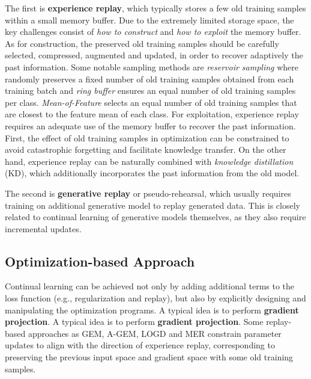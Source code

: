 The first is \textbf{experience replay}, which typically stores a few old training samples within a small memory buffer. Due to the extremely limited storage space, the key challenges consist of \textit{how to construct} and \textit{how to exploit} the memory buffer.  As for construction, the preserved old training samples should be carefully selected, compressed, augmented and updated, in order to recover adaptively the past information.  Some notable sampling methods are \textit{reservoir sampling} where randomly preserves a fixed number of old training samples obtained from each training batch and \textit{ring buffer} ensures an equal number of old training samples per class.  \textit{Mean-of-Feature} selects an equal number of old training samples that are closest to the feature mean of each class.  For exploitation, experience replay requires an adequate use of the memory buffer to recover the past information.  First, the effect of old training samples in optimization can be constrained to avoid catastrophic forgetting and facilitate knowledge transfer.  On the other hand, experience replay can be naturally combined with \textit{knowledge distillation} (KD), which additionally incorporates the past information from the old model.

The second is \textbf{generative replay} or pseudo-rehearsal, which usually requires training on additional generative model to replay generated data. This is closely related to continual learning of generative models themselves, as they also require incremental updates.

\subsection{Optimization-based Approach}
Continual learning can be achieved not only by adding additional terms to the loss function (e.g., regularization and replay), but also by explicitly designing and manipulating the optimization programs. A typical idea is to perform \textbf{gradient projection}.  A typical idea is to perform \textbf{gradient projection}. Some replay-based approaches as GEM, A-GEM, LOGD and MER constrain parameter updates to align with the direction of experience replay, corresponding to preserving the previous input space and gradient space with some old training samples. 
